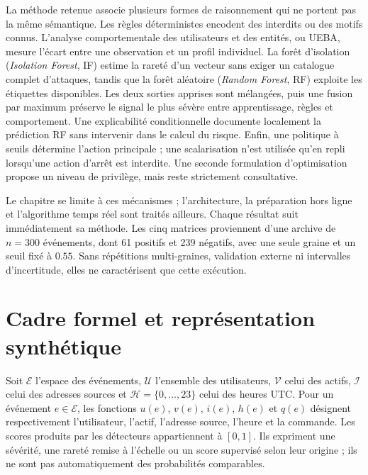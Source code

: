 \documentclass[11pt,a4paper,oneside]{report}
\theoremstyle{definition}
\theoremstyle{plain}
\begin{document}
La méthode retenue associe plusieurs formes de raisonnement qui ne portent pas la même sémantique. Les règles déterministes encodent des interdits ou des motifs connus. L'analyse comportementale des utilisateurs et des entités, ou UEBA, mesure l'écart entre une observation et un profil individuel. La forêt d'isolation (\emph{Isolation Forest}, IF) estime la rareté d'un vecteur sans exiger un catalogue complet d'attaques, tandis que la forêt aléatoire (\emph{Random Forest}, RF) exploite les étiquettes disponibles. Les deux sorties apprises sont mélangées, puis une fusion par maximum préserve le signal le plus sévère entre apprentissage, règles et comportement. Une explicabilité conditionnelle documente localement la prédiction RF sans intervenir dans le calcul du risque. Enfin, une politique à seuils détermine l'action principale ; une scalarisation n'est utilisée qu'en repli lorsqu'une action d'arrêt est interdite. Une seconde formulation d'optimisation propose un niveau de privilège, mais reste strictement consultative.

Le chapitre se limite à ces mécanismes ; l'architecture, la préparation hors ligne et l'algorithme temps réel sont traités ailleurs. Chaque résultat suit immédiatement sa méthode. Les cinq matrices proviennent d'une archive de $n=300$ événements, dont 61 positifs et 239 négatifs, avec une seule graine et un seuil fixé à $0.55$. Sans répétitions multi-graines, validation externe ni intervalles d'incertitude, elles ne caractérisent que cette exécution.

\section{Cadre formel et représentation synthétique}
\label{sec:ai-ro-formal}

Soit $\mathcal{E}$ l'espace des événements, $\mathcal{U}$ l'ensemble des utilisateurs, $\mathcal{V}$ celui des actifs, $\mathcal{I}$ celui des adresses sources et $\mathcal{H}=\{0,\ldots,23\}$ celui des heures UTC. Pour un événement $e\in\mathcal{E}$, les fonctions $u(e)$, $v(e)$, $i(e)$, $h(e)$ et $q(e)$ désignent respectivement l'utilisateur, l'actif, l'adresse source, l'heure et la commande. Les scores produits par les détecteurs appartiennent à $[0,1]$. Ils expriment une sévérité, une rareté remise à l'échelle ou un score supervisé selon leur origine ; ils ne sont pas automatiquement des probabilités comparables.
\end{document}
